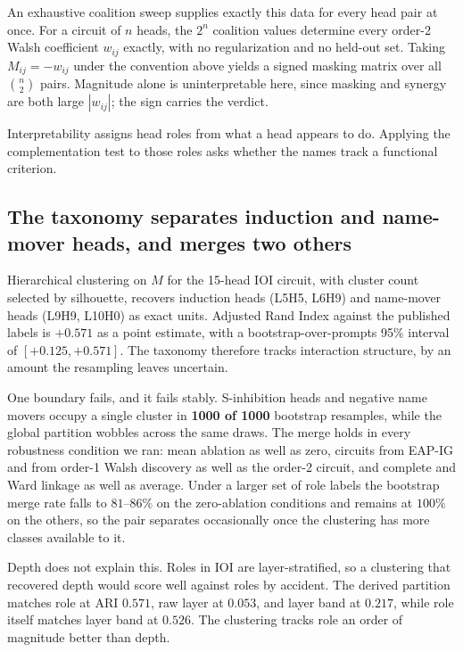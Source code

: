 An exhaustive coalition sweep supplies exactly this data for every head pair at once. For a
circuit of $n$ heads, the $2^n$ coalition values determine every order-2 Walsh coefficient
$w_{ij}$ exactly, with no regularization and no held-out set. Taking $M_{ij} = -w_{ij}$
under the convention above yields a signed masking matrix over all $\binom{n}{2}$ pairs.
Magnitude alone is uninterpretable here, since masking and synergy are both large
$|w_{ij}|$; the sign carries the verdict.

Interpretability assigns head roles from what a head appears to do. Applying the
complementation test to those roles asks whether the names track a functional criterion.

\subsection{The taxonomy separates induction and name-mover heads, and merges two others}

Hierarchical clustering on $M$ for the 15-head IOI circuit, with cluster count selected by
silhouette, recovers induction heads (L5H5, L6H9) and name-mover heads (L9H9, L10H0) as
exact units. Adjusted Rand Index against the published labels is $+0.571$ as a point
estimate, with a bootstrap-over-prompts 95\% interval of $[+0.125, +0.571]$. The taxonomy
therefore tracks interaction structure, by an amount the resampling leaves uncertain.

One boundary fails, and it fails stably. S-inhibition heads and negative name movers occupy
a single cluster in \textbf{1000 of 1000} bootstrap resamples, while the global partition
wobbles across the same draws. The merge holds in every robustness condition we ran: mean
ablation as well as zero, circuits from EAP-IG and from order-1 Walsh discovery as well as
the order-2 circuit, and complete and Ward linkage as well as average. Under a larger set of
role labels the bootstrap merge rate falls to $81$--$86\%$ on the zero-ablation conditions
and remains at $100\%$ on the others, so the pair separates occasionally once the clustering
has more classes available to it.

Depth does not explain this. Roles in IOI are layer-stratified, so a clustering that
recovered depth would score well against roles by accident. The derived partition matches
role at ARI $0.571$, raw layer at $0.053$, and layer band at $0.217$, while role itself
matches layer band at $0.526$. The clustering tracks role an order of magnitude better than
depth.

